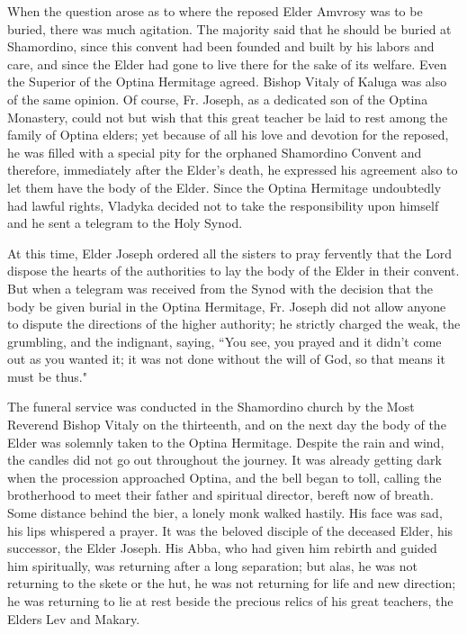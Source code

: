 When the question arose as to where the reposed Elder Amvrosy was to be buried, there was much agitation. The majority said that he should be buried at Shamordino, since this convent had been founded and built by his labors and care, and since the Elder had gone to live there for the sake of its welfare. Even the Superior of the Optina Hermitage agreed. Bishop Vitaly of Kaluga was also of the same opinion. Of course, Fr. Joseph, as a dedicated son of the Optina Monastery, could not but wish that this great teacher be laid to rest among the family of Optina elders; yet because of all his love and devotion for the reposed, he was filled with a special pity for the orphaned Shamordino Convent and therefore, immediately after the Elder's death, he expressed his agreement also to let them have the body of the Elder. Since the Optina Hermitage undoubtedly had lawful rights, Vladyka decided not to take the responsibility upon himself and he sent a telegram to the Holy Synod.

At this time, Elder Joseph ordered all the sisters to pray fervently that the Lord dispose the hearts of the authorities to lay the body of the Elder in their convent. But when a telegram was received from the Synod with the decision that the body be given burial in the Optina Hermitage, Fr. Joseph did not allow anyone to dispute the directions of the higher authority; he strictly charged the weak, the grumbling, and the indignant, saying, “You see, you prayed and it didn't come out as you wanted it; it was not done without the will of God, so that means it must be thus."

The funeral service was conducted in the Shamordino church by the Most Reverend Bishop Vitaly on the thirteenth, and on the next day the body of the Elder was solemnly taken to the Optina Hermitage. Despite the rain and wind, the candles did not go out throughout the journey. It was already getting dark when the procession approached Optina, and the bell began to toll, calling the brotherhood to meet their father and spiritual director, bereft now of breath. Some distance behind the bier, a lonely monk walked hastily. His face was sad, his lips whispered a prayer. It was the beloved disciple of the deceased Elder, his successor, the Elder Joseph. His Abba, who had given him rebirth and guided him spiritually, was returning after a long separation; but alas, he was not returning to the skete or the hut, he was not returning for life and new direction; he was returning to lie at rest beside the precious relics of his great teachers, the Elders Lev and Makary.

